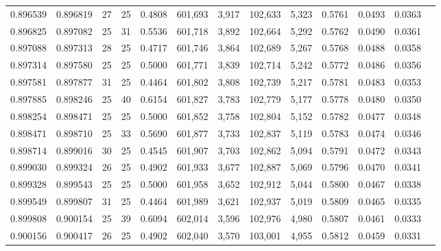 \begin{tabular}{rrrrrrrrrrrrr}
0.896539 & 0.896819 &    27 &  25 &                                     0.4808 & 601,693 &   3,917 & 102,633 &   5,323 & 0.5761 & 0.0493 & 0.0363 \\
0.896825 & 0.897082 &    25 &  31 &                                     0.5536 & 601,718 &   3,892 & 102,664 &   5,292 & 0.5762 & 0.0490 & 0.0361 \\
0.897088 & 0.897313 &    28 &  25 &                                     0.4717 & 601,746 &   3,864 & 102,689 &   5,267 & 0.5768 & 0.0488 & 0.0358 \\
0.897314 & 0.897580 &    25 &  25 &                                     0.5000 & 601,771 &   3,839 & 102,714 &   5,242 & 0.5772 & 0.0486 & 0.0356 \\
0.897581 & 0.897877 &    31 &  25 &                                     0.4464 & 601,802 &   3,808 & 102,739 &   5,217 & 0.5781 & 0.0483 & 0.0353 \\
0.897885 & 0.898246 &    25 &  40 &                                     0.6154 & 601,827 &   3,783 & 102,779 &   5,177 & 0.5778 & 0.0480 & 0.0350 \\
0.898254 & 0.898471 &    25 &  25 &                                     0.5000 & 601,852 &   3,758 & 102,804 &   5,152 & 0.5782 & 0.0477 & 0.0348 \\
0.898471 & 0.898710 &    25 &  33 &                                     0.5690 & 601,877 &   3,733 & 102,837 &   5,119 & 0.5783 & 0.0474 & 0.0346 \\
0.898714 & 0.899016 &    30 &  25 &                                     0.4545 & 601,907 &   3,703 & 102,862 &   5,094 & 0.5791 & 0.0472 & 0.0343 \\
0.899030 & 0.899324 &    26 &  25 &                                     0.4902 & 601,933 &   3,677 & 102,887 &   5,069 & 0.5796 & 0.0470 & 0.0341 \\
0.899328 & 0.899543 &    25 &  25 &                                     0.5000 & 601,958 &   3,652 & 102,912 &   5,044 & 0.5800 & 0.0467 & 0.0338 \\
0.899549 & 0.899807 &    31 &  25 &                                     0.4464 & 601,989 &   3,621 & 102,937 &   5,019 & 0.5809 & 0.0465 & 0.0335 \\
0.899808 & 0.900154 &    25 &  39 &                                     0.6094 & 602,014 &   3,596 & 102,976 &   4,980 & 0.5807 & 0.0461 & 0.0333 \\
0.900156 & 0.900417 &    26 &  25 &                                     0.4902 & 602,040 &   3,570 & 103,001 &   4,955 & 0.5812 & 0.0459 & 0.0331 \\

\end{tabular}
